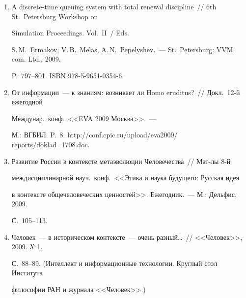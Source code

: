 \begin{enumerate}[1.]
Control of Markov chains with constaints~// Тр. VIII~Междунар.\ конф.\ 


<<Идентификация и задачи управления>> SICPRO'09.~--- М.: ИПУ 


РАН, 2009. С.~737--760. 





\item {}


A discrete-time queuing system with total renewal discipline~//  6th St.~Petersburg Workshop on 


Simulation Proceedings. Vol.~II~/ Eds.  


S.\,M.~Ermakov, V.\,B.~Melas, A.\,N.~Pepelyshev.~--- St.\ Petersburg: VVM com. Ltd., 2009. 


 P.~797--801. ISBN 978-5-9651-0354-6.





\item {}


От информации~--- к знаниям: возникает ли Homo eruditus?~// Докл.\ 12-й ежегодной 


Междунар.\ конф.\ <<EVA 2009 Москва>>.~---


М.: ВГБИЛ. P.~8. {\sf http://conf.cpic.ru/\linebreak upload/eva2009/ reports/doklad\_1708.doc}.





\item {}


Развитие России в контексте метаэволюции Человечества~// Мат-лы 8-й 


междисциплинарной науч.\ конф.\ <<Этика и наука будущего: Русская идея 


в контексте общечеловеческих ценностей>>. Ежегодник.~--- М.: Дельфис, 2009. 


С.~105--113.





\item {}


Человек~--- в историческом контексте~--- очень разный\ldots~// <<Человек>>, 2009. №\,1. 


С.~88--89. (Интеллект и информационные технологии. Круглый стол Института 


философии РАН и журнала <<Человек>>.)






\end{enumerate}
